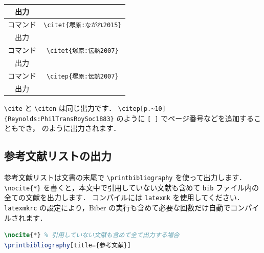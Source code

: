 \documentclass[
    paper=a4paper,      %
    article,            %
    fontsize=11pt,      %
    jafontsize=11pt,    %
    head_space=25mm,    %
    foot_space=25mm,    %
    gutter=20mm,        %
    fore-edge=20mm      %
    ]{jlreq}            %
\begin{document}
\begin{bluebox}[title={文献を引用するためのコマンド}]
\begin{tabular}{c|c}
    出力     & \citet{塚原:ながれ2023} \\ \hline
    コマンド & \verb|\citet{塚原:ながれ2015}| \\
    出力     & \citet{塚原:ながれ2015} \\ \hline
    コマンド & \verb|\citet{塚原:伝熱2007}| \\
    出力     & \citet{塚原:伝熱2007} \\ \hline
    コマンド & \verb|\citep{塚原:伝熱2007}| \\
    出力     & \citep{塚原:伝熱2007} \\ \hline
  \end{tabular}
\end{bluebox}

\verb|\cite| と \verb|\citen| は同じ出力です．
\verb|\citep[p.~10]{Reynolds:PhilTransRoySoc1883}| のように \verb|[ ]| でページ番号などを追加することもでき，\citep[p.~10]{Reynolds:PhilTransRoySoc1883} のように出力されます．

\subsection{参考文献リストの出力}
\label{ssec:bib-print}

参考文献リストは文書の末尾で \verb|\printbibliography| を使って出力します．
\verb|\nocite{*}| を書くと，本文中で引用していない文献も含めて \verb|bib| ファイル内の全ての文献を出力します．
コンパイルには \verb|latexmk| を使用してください．
\verb|latexmkrc| の設定により，Biber の実行も含めて必要な回数だけ自動でコンパイルされます．

\begin{lstlisting}[language=TeX]
\nocite{*} % 引用していない文献も含めて全て出力する場合
\printbibliography[title={参考文献}]
\end{lstlisting}

\clearpage
\nocite{*}
\printbibliography[title={参考文献}]
\end{document}
